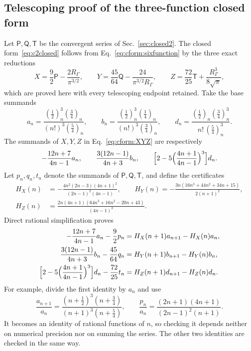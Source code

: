 \documentclass[11pt,a4paper]{article}
\numberwithin{equation}{section}
\begin{document}
\subsection{Telescoping proof of the three-function closed form}\label{app:cform:telescoping}
Let $\mathsf P,\mathsf Q,\mathsf T$ be the convergent series of Sec.~\ref{sec:closed2}. The closed
form~\eqref{eq:c2closed} follows from Eq.~\eqref{eq:cform:sixfunction} by the three exact reductions
\begin{equation}
 X=\frac92\mathsf P-\frac{2R_\Gamma}{\pi^{3/2}},\qquad
 Y=\frac{45}{64}\mathsf Q-\frac{24}{\pi^{3/2}R_\Gamma},\qquad
 Z=\frac{72}{25}\mathsf T+\frac{R_\Gamma^3}{8\sqrt\pi},
 \label{eq:cform:XYZfinal}
\end{equation}
which are proved here with every telescoping endpoint retained. Take the base summands
\begin{equation}
 a_n=\frac{(\frac12)_n^3(\frac34)_n}{(n!)^3(\frac54)_n},\qquad
 b_n=\frac{(\frac12)_n^3(\frac14)_n}{(n!)^3(\frac34)_n},\qquad
 d_n=\frac{(\frac12)_n(\frac34)_n^3}{n!\,(\frac54)_n^3}.
\end{equation}
The summands of $X,Y,Z$ in Eq.~\eqref{eq:cform:XYZ} are respectively
\begin{equation}
 -\frac{12n+7}{4n-1}a_n,\qquad\frac{3(12n-1)}{4n+3}b_n,\qquad
 \Bigl[2-5\Bigl(\frac{4n+1}{4n-1}\Bigr)^3\Bigr]d_n.
\end{equation}
Let $p_n,q_n,t_n$ denote the summands of $\mathsf P,\mathsf Q,\mathsf T$, and define the certificates
\begin{equation}
\begin{aligned}
 H_X(n)&=-\frac{4n^2(2n-3)(4n+1)^2}{(2n-1)^2(4n-1)},\qquad
 H_Y(n)=-\frac{3n(16n^3+44n^2+34n+15)}{2(n+1)^2},\\
 H_Z(n)&=\frac{2n(4n+1)(64n^3+16n^2-20n+43)}{(4n-1)^3}.
\end{aligned}
\end{equation}
Direct rational simplification proves
\begin{equation}
\begin{aligned}
 -\frac{12n+7}{4n-1}a_n-\frac92p_n&=H_X(n+1)a_{n+1}-H_X(n)a_n,\\
 \frac{3(12n-1)}{4n+3}b_n-\frac{45}{64}q_n&=H_Y(n+1)b_{n+1}-H_Y(n)b_n,\\
 \Bigl[2-5\Bigl(\frac{4n+1}{4n-1}\Bigr)^3\Bigr]d_n-\frac{72}{25}t_n&=H_Z(n+1)d_{n+1}-H_Z(n)d_n.
\end{aligned}
 \label{eq:cform:telescoping}
\end{equation}
For example, divide the first identity by $a_n$ and use
\begin{equation}
 \frac{a_{n+1}}{a_n}=\frac{(n+\frac12)^3(n+\frac34)}{(n+1)^3(n+\frac54)},\qquad
 \frac{p_n}{a_n}=\frac{(2n+1)(4n+1)}{(2n-1)^2(n+1)}.
\end{equation}
It becomes an identity of rational functions of $n$, so checking it depends neither on numerical precision nor on
summing the series. The other two identities are checked in the same way.
\end{document}
